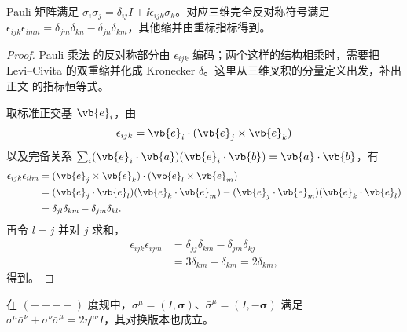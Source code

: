 \begin{lemma}
Pauli 矩阵满足 $\sigma_i\sigma_j=\delta_{ij}I+\ii\epsilon_{ijk}\sigma_k$。对应三维完全反对称符号满足 $\epsilon_{ijk}\epsilon_{imn}=\delta_{jm}\delta_{kn}-\delta_{jn}\delta_{km}$，其他缩并由重标指标得到。
\end{lemma}

\begin{proof}
Pauli 乘法 的反对称部分由 $\epsilon_{ijk}$ 编码；两个这样的结构相乘时，需要把 Levi--Civita 的双重缩并化成 Kronecker $\delta$。这里从三维叉积的分量定义出发，补出正文 的指标恒等式。



取标准正交基 $\vb{e}_i$，由
\begin{equation*}
 \epsilon_{ijk}=\vb{e}_i\cdot(\vb{e}_j\times\vb{e}_k)
\end{equation*}
以及完备关系 $\sum_i(\vb{e}_i\cdot\vb{a})(\vb{e}_i\cdot\vb{b})=\vb{a}\cdot\vb{b}$，有
\begin{align*}
 \epsilon_{ijk}\epsilon_{ilm}
 &= (\vb{e}_j\times\vb{e}_k)\cdot(\vb{e}_l\times\vb{e}_m)\\
 &= (\vb{e}_j\cdot\vb{e}_l)(\vb{e}_k\cdot\vb{e}_m)
 -(\vb{e}_j\cdot\vb{e}_m)(\vb{e}_k\cdot\vb{e}_l)\\
 &=\delta_{jl}\delta_{km}-\delta_{jm}\delta_{kl}.
\end{align*}
再令 $l=j$ 并对 $j$ 求和，
\begin{align*}
 \epsilon_{ijk}\epsilon_{ijm}
 &=\delta_{jj}\delta_{km}-\delta_{jm}\delta_{kj}\\
 &=3\delta_{km}-\delta_{km}=2\delta_{km},
\end{align*}
得到。
\end{proof}

\begin{lemma}
在 $(+---)$ 度规中，$\sigma^\mu=(I,\boldsymbol\sigma)$、$\bar\sigma^\mu=(I,-\boldsymbol\sigma)$ 满足 $\sigma^\mu\bar\sigma^\nu+\sigma^\nu\bar\sigma^\mu=2\eta^{\mu\nu}I$，其对换版本也成立。
\end{lemma}

